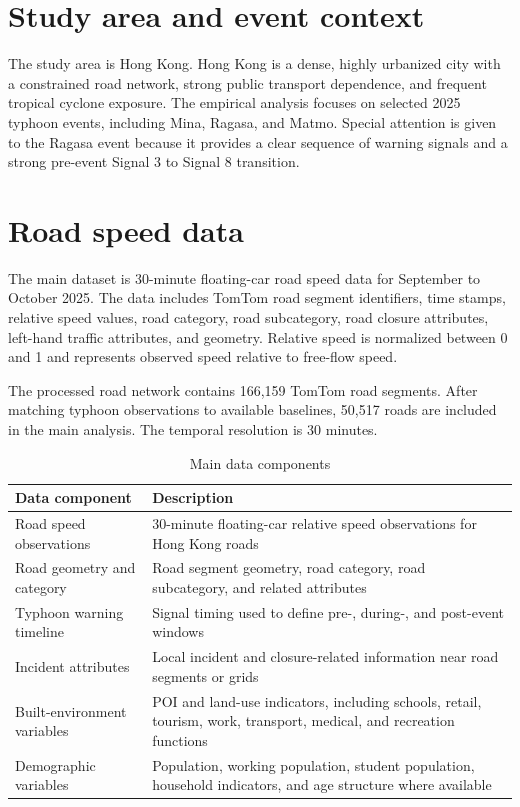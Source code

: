 \documentclass[12pt,a4paper]{report}
\begin{document}
\section{Study area and event context}
The study area is Hong Kong. Hong Kong is a dense, highly urbanized city with a constrained road network, strong public transport dependence, and frequent tropical cyclone exposure. The empirical analysis focuses on selected 2025 typhoon events, including Mina, Ragasa, and Matmo. Special attention is given to the Ragasa event because it provides a clear sequence of warning signals and a strong pre-event Signal 3 to Signal 8 transition.

\section{Road speed data}
The main dataset is 30-minute floating-car road speed data for September to October 2025. The data includes TomTom road segment identifiers, time stamps, relative speed values, road category, road subcategory, road closure attributes, left-hand traffic attributes, and geometry. Relative speed is normalized between 0 and 1 and represents observed speed relative to free-flow speed.

The processed road network contains 166,159 TomTom road segments. After matching typhoon observations to available baselines, 50,517 roads are included in the main analysis. The temporal resolution is 30 minutes.

\begin{table}[H]
\centering
\caption{Main data components}
\begin{tabularx}{\textwidth}{lX}
\toprule
Data component & Description \\
\midrule
Road speed observations & 30-minute floating-car relative speed observations for Hong Kong roads \\
Road geometry and category & Road segment geometry, road category, road subcategory, and related attributes \\
Typhoon warning timeline & Signal timing used to define pre-, during-, and post-event windows \\
Incident attributes & Local incident and closure-related information near road segments or grids \\
Built-environment variables & POI and land-use indicators, including schools, retail, tourism, work, transport, medical, and recreation functions \\
Demographic variables & Population, working population, student population, household indicators, and age structure where available \\
\bottomrule
\end{tabularx}
\end{table}
\end{document}

